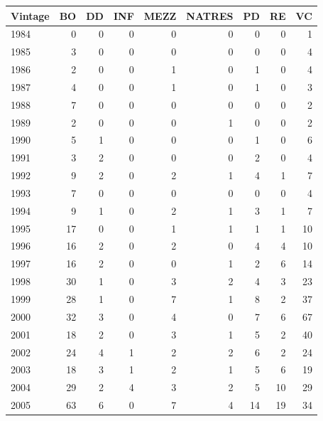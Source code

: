 \begin{table}[ht]
	\centering
	\begin{tabular}{lrrrrrrrr}
		Vintage & BO & DD & INF & MEZZ & NATRES & PD & RE & VC \\ 
		\hline
		\hline
		1984 &   0 &   0 &   0 &   0 &   0 &   0 &   0 &   1 \\ 
		1985 &   3 &   0 &   0 &   0 &   0 &   0 &   0 &   4 \\ 
		1986 &   2 &   0 &   0 &   1 &   0 &   1 &   0 &   4 \\ 
		1987 &   4 &   0 &   0 &   1 &   0 &   1 &   0 &   3 \\ 
		1988 &   7 &   0 &   0 &   0 &   0 &   0 &   0 &   2 \\ 
		1989 &   2 &   0 &   0 &   0 &   1 &   0 &   0 &   2 \\ 
		1990 &   5 &   1 &   0 &   0 &   0 &   1 &   0 &   6 \\ 
		1991 &   3 &   2 &   0 &   0 &   0 &   2 &   0 &   4 \\ 
		1992 &   9 &   2 &   0 &   2 &   1 &   4 &   1 &   7 \\ 
		1993 &   7 &   0 &   0 &   0 &   0 &   0 &   0 &   4 \\ 
		1994 &   9 &   1 &   0 &   2 &   1 &   3 &   1 &   7 \\ 
		1995 &  17 &   0 &   0 &   1 &   1 &   1 &   1 &  10 \\ 
		1996 &  16 &   2 &   0 &   2 &   0 &   4 &   4 &  10 \\ 
		1997 &  16 &   2 &   0 &   0 &   1 &   2 &   6 &  14 \\ 
		1998 &  30 &   1 &   0 &   3 &   2 &   4 &   3 &  23 \\ 
		1999 &  28 &   1 &   0 &   7 &   1 &   8 &   2 &  37 \\ 
		2000 &  32 &   3 &   0 &   4 &   0 &   7 &   6 &  67 \\ 
		2001 &  18 &   2 &   0 &   3 &   1 &   5 &   2 &  40 \\ 
		2002 &  24 &   4 &   1 &   2 &   2 &   6 &   2 &  24 \\ 
		2003 &  18 &   3 &   1 &   2 &   1 &   5 &   6 &  19 \\ 
		2004 &  29 &   2 &   4 &   3 &   2 &   5 &  10 &  29 \\ 
		2005 &  63 &   6 &   0 &   7 &   4 &  14 &  19 &  34 \\ 

\end{tabular}
\end{table}
